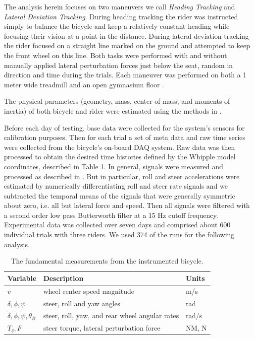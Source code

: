 \documentclass[a4paper]{article}
\begin{document}
The analysis herein focuses on two maneuvers we call \emph{Heading Tracking}
and \emph{Lateral Deviation Tracking}. During heading tracking the rider was
instructed simply to balance the bicycle and keep a relatively constant heading
while focusing their vision at a point in the distance. During lateral
deviation tracking the rider focused on a straight line marked on the ground
and attempted to keep the front wheel on this line. Both tasks were performed
with and without manually applied lateral perturbation forces just below the
seat, random in direction and time during the trials. Each maneuver was
performed on both a 1 meter wide treadmill and an open gymnasium floor
\cite{Moore2012}.

The physical parameters (geometry, mass, center of mass, and moments of
inertia) of both bicycle and rider were estimated using the methods in
\cite{Moore2012}.

Before each day of testing, base data were collected for the system's sensors
for calibration purposes. Then for each trial a set of meta data and raw time
series were collected from the bicycle's on-board DAQ system. Raw data was then
processed to obtain the desired time histories defined by the Whipple model
coordinates, described in Table \ref{tab:measurements}. In general, signals
were measured and processed as described in \cite{Moore2012}. But in
particular, roll and steer accelerations were estimated by numerically
differentiating roll and steer rate signals and we subtracted the temporal
means of the signals that were generally symmetric about zero, i.e. all but
lateral force and speed. Then all signals were filtered with a second order low
pass Butterworth filter at a 15 Hz cutoff frequency. Experimental data was
collected over seven days and comprised about 600 individual trials with three
riders. We used 374 of the runs for the following analysis.

\begin{table}
  \centering
  \caption{The fundamental measurements from the instrumented bicycle.}
  \begin{tabular}{lll}
    \toprule
    Variable                                            & Description                                    & Units \\
    \midrule
    $v$                                                 & wheel center speed magnitude                   & m/s   \\
    $\delta,\phi,\psi$                                  & steer, roll and yaw angles                     & rad   \\
    $\dot{\delta},\dot{\phi},\dot{\psi},\dot{\theta}_B$ & steer, roll, yaw, and rear wheel angular rates & rad/s \\
    $T_\delta,F$                                        & steer torque, lateral perturbation force       & NM, N \\
    \bottomrule
  \end{tabular}
  \label{tab:measurements}
\end{table}
\end{document}
